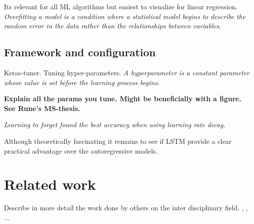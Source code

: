 Its relevant for all ML algorithms but easiest to visualize for linear regression.
\textit{Overfitting a model is a condition where a statistical model begins to describe the random error in the data rather than the relationships between variables.}

\subsection{Framework and configuration} \label{sec:hyperparam_tuning}
Keras-tuner. Tuning hyper-parameters.
\textit{A hyperparameter is a constant parameter whose value is set before the learning process begins.}

\textbf{Explain all the params you tune. Might be beneficially with a figure. See Rune's MS-thesis.}

\textit{Learning to forget found the best accuracy when using learning rate decay.}


Although theoretically fascinating it remains to see if LSTM provide a clear practical advantage over the autoregressive models.

\section{Related work} \label{sec:related_work}
Describe in more detail the work done by others on the inter disciplinary field. \cite{SunAirLSTM}, \cite{precip_nowcasting}, \cite{Liu2014DeepForecasting} ...



